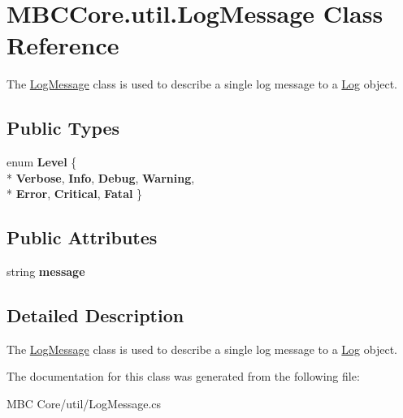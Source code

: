 \hypertarget{class_m_b_c_core_1_1util_1_1_log_message}{\section{M\-B\-C\-Core.\-util.\-Log\-Message Class Reference}
\label{class_m_b_c_core_1_1util_1_1_log_message}
}


The \hyperlink{class_m_b_c_core_1_1util_1_1_log_message}{Log\-Message} class is used to describe a single log message to a \hyperlink{class_m_b_c_core_1_1util_1_1_log}{Log} object. 


\subsection*{Public Types}
\begin{DoxyCompactItemize}
\item 
enum {\bfseries Level} \{ \\*
{\bfseries Verbose}, 
{\bfseries Info}, 
{\bfseries Debug}, 
{\bfseries Warning}, 
\\*
{\bfseries Error}, 
{\bfseries Critical}, 
{\bfseries Fatal}
 \}
\end{DoxyCompactItemize}
\subsection*{Public Attributes}
\begin{DoxyCompactItemize}
\item 
\hypertarget{class_m_b_c_core_1_1util_1_1_log_message_ac13d07af29da793b7e09e2911cfe1b6e}{string {\bfseries message}}\label{class_m_b_c_core_1_1util_1_1_log_message_ac13d07af29da793b7e09e2911cfe1b6e}

\end{DoxyCompactItemize}


\subsection{Detailed Description}
The \hyperlink{class_m_b_c_core_1_1util_1_1_log_message}{Log\-Message} class is used to describe a single log message to a \hyperlink{class_m_b_c_core_1_1util_1_1_log}{Log} object.

The documentation for this class was generated from the following file\-:\begin{DoxyCompactItemize}
\item 
M\-B\-C Core/util/Log\-Message.\-cs\end{DoxyCompactItemize}
